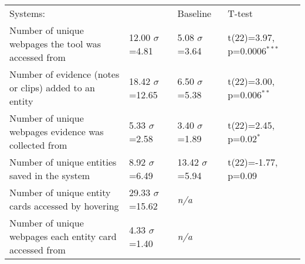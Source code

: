 

\begin{table*}
  \centering
  \footnotesize
  \begin{tabular}{p{}  p{} p{} p{}}
  
	
	Systems: &
	{\SYSTEM} &
	Baseline& 
	T-test
	\\
	
	\arrayrulecolor{black}\hline
	
	Number of unique webpages the tool was accessed from &
    12.00 \newline $\sigma$=4.81 &
    5.08  \newline $\sigma$=3.64 &
    t(22)=3.97, p=0.0006$^{***}$
    \\
    
	\arrayrulecolor{mygray}\hline
    
	Number of evidence (notes or clips) added to an entity &
    18.42 \newline $\sigma$=12.65 &
    6.50  \newline $\sigma$=5.38 &
    t(22)=3.00, p=0.006$^{**}$
    \\
    
    \hline

	Number of unique webpages evidence was collected from &
    5.33 \newline $\sigma$=2.58 &
    3.40 \newline $\sigma$=1.89 &
    t(22)=2.45, p=0.02$^{*}$
    \\
    
    \hline
    
	Number of unique entities saved in the system &
    8.92  \newline $\sigma$=6.49 &
    13.42 \newline $\sigma$=5.94 &
    t(22)=-1.77, p=0.09
    \\
    
    \hline
    
	Number of unique entity cards accessed by hovering &
    29.33 \newline $\sigma$=15.62 & 
    \textit{n/a} &
    \\
    
    \hline
    
	Number of unique webpages each entity card accessed from &
    4.33 \newline $\sigma$=1.40 &
    \textit{n/a} &
    \\
    

\end{tabular}
\end{table*}
